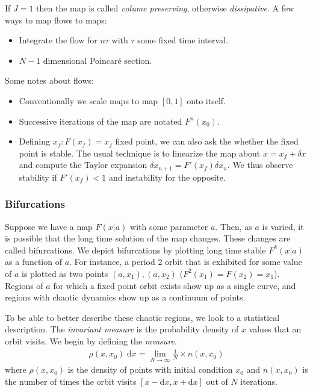 \documentclass[12pt]{article}
\begin{document}
If $J = 1$ then the map is called \emph{volume preserving}, otherwise
\emph{dissipative}. A few ways to map flows to maps:
\begin{itemize}
    \item Integrate the flow for $n\tau$ with $\tau$ some fixed time interval.
    \item $N-1$ dimensional Poincar\'e section.
\end{itemize}

Some notes about flows:
\begin{itemize}
    \item Conventionally we scale maps to map $[0,1]$ onto itself.
    \item Successive iterations of the map are notated $F^n(x_0)$.
    \item Defining $x_f: F(x_f) = x_f$ fixed point, we can also ask the whether
        the fixed point is stable. The usual technique is to linearize the map
        about $x = x_f + \delta x$ and compute the Taylor expansion $\delta
        x_{n+1} = F'(x_f) \delta x_n$. We thus observe stability if $F'(x_f) <
        1$ and instability for the opposite.
\end{itemize}

\subsubsection{Bifurcations}

Suppose we have a map $F(x|a)$ with some parameter $a$. Then, as $a$ is varied,
it is possible that the long time solution of the map changes. These changes are
called bifurcations. We depict bifurcations by plotting long time stable
$F^k(x|a)$ as a function of $a$. For instance, a period 2 orbit that is
exhibited for some value of $a$ is plotted as two points $(a, x_1), (a, x_2)$
($F^2(x_1) = F(x_2) = x_1$). Regions of $a$ for which a fixed point orbit exists
show up as a single curve, and regions with chaotic dynamics show up as a
continuum of points.

To be able to better describe these chaotic regions, we look to a statistical
description. The \emph{invariant measure} is the probability density of $x$
values that an orbit visits. We begin by defining the \emph{measure}.
\begin{align}
    \rho(x,x_0) \;\mathrm{d}x = \lim_{N \to \infty} \frac{1}{N} \times n(x,x_0)
\end{align}
where $\rho(x,x_0)$ is the density of points with initial condition $x_0$ and
$n(x,x_0)$ is the number of times the orbit visits $[x-\mathrm{d}x,
x+\mathrm{d}x]$ out of $N$ iterations.
\end{document}
